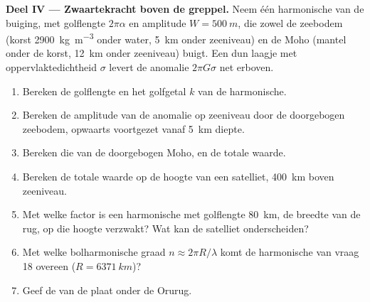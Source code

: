 \begin{problem}
\noindent\textbf{Deel IV --- Zwaartekracht boven de greppel.} Neem één harmonische van de
buiging, met golflengte $2\pi\alpha$ en amplitude $W = \qty{500}{m}$, die
zowel de zeebodem (korst \qty{2900}{kg.m^{-3}} onder water, \qty{5}{km} onder
zeeniveau) en de Moho (mantel onder de korst, \qty{12}{km} onder zeeniveau) buigt. Een
dun laagje met oppervlaktedichtheid $\sigma$ levert de anomalie $2\pi G\sigma$
net erboven.
\begin{enumerate}[resume]
  \item Bereken de golflengte en het golfgetal $k$ van de harmonische.
  \item Bereken de amplitude van de anomalie op zeeniveau door de doorgebogen
        zeebodem, opwaarts voortgezet vanaf \qty{5}{km} diepte.
  \item Bereken die van de doorgebogen Moho, en de totale waarde.
  \item Bereken de totale waarde op de hoogte van een satelliet, \qty{400}{km} boven
        zeeniveau.
  \item Met welke factor is een harmonische met golflengte \qty{80}{km}, de breedte van
        de rug, op die hoogte verzwakt? Wat kan de satelliet onderscheiden?
  \item Met welke bolharmonische graad $n \approx 2\pi R/\lambda$ komt de
        harmonische van vraag 18 overeen ($R = \qty{6371}{km}$)?
  \item Geef de  van de plaat onder de
        Orurug.
\end{enumerate}
\end{problem}
